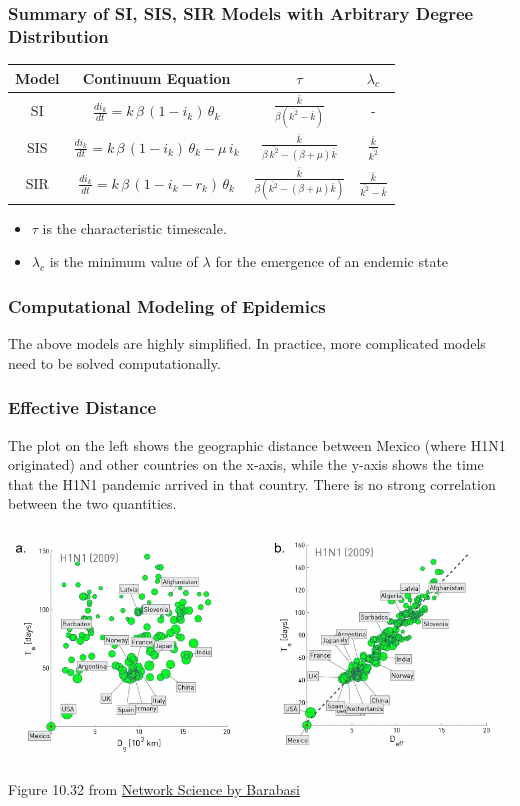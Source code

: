\documentclass[11pt]{scrartcl} %
\begin{document}
\subsubsection{Summary of SI, SIS, SIR Models with Arbitrary Degree Distribution}
\begin{center}
\begin{tabular}{ | c | c | c | c |}
	\hline
	Model & Continuum Equation & $\tau$ & $\lambda_c$ \\ 
	\hline
	SI & $\frac{di_k}{dt}=k\, \beta \, (1-i_k) \, \theta_k$ &  $\frac{\bar{k}}{\beta(\bar{k^2}-\bar{k})}$ & -\\  
	\hline
	SIS & $\frac{di_k}{dt}=k\, \beta \, (1-i_k) \, \theta_k - \mu \, i_k$ &  $\frac{\bar{k}}{\beta \, \bar{k^2}-(\beta+\mu)\bar{k}}$ & $\frac{\bar{k}}{\bar{k^2}}$\\  
	\hline
	SIR & $\frac{di_k}{dt}=k\, \beta \, (1-i_k-r_k) \, \theta_k$ &  $\frac{\bar{k}}{\beta(\bar{k^2}-(\beta+\mu)\bar{k})}$ & $\frac{\bar{k}}{\bar{k^2}-\bar{k}}$\\  
	\hline
\end{tabular}
\end{center}
\begin{itemize}
	\item $\tau$ is the characteristic timescale.
	\item $\lambda_c$ is the minimum value of $\lambda$ for the emergence of an endemic state
\end{itemize}

\subsubsection{Computational Modeling of Epidemics}
The above models are highly simplified. In practice, more complicated models need to be solved computationally.


\subsubsection{Effective Distance}
The plot on the left shows the geographic distance between Mexico (where H1N1 originated) and other countries on the x-axis, while the y-axis shows the time that the H1N1 pandemic arrived in that country. There is no strong correlation between the two quantities.
\begin{center}
\includegraphics[width=0.9\linewidth]{img/L9.5_EffectiveDistance.jpg}

{\tiny Figure 10.32 from \href{http://networksciencebook.com/}{Network Science by Barabasi}}
\end{center}
\end{document}
